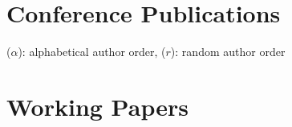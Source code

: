 \documentclass{article}
\begin{document}
    \section{Conference Publications}
    {\footnotesize($\alpha$): alphabetical author order, ($r$): random author order}
    
    \begin{etaremune}
    	[itemsep=0.2ex,
    	leftmargin=4.8ex]
    	\renewcommand{\labelenumi}{C\theenumi.}
        
    \end{etaremune}

    
    
%        
%    
%   
    
    
    
    
    
    \section{Working Papers}
    \begin{etaremune}
    	[itemsep=0.2ex,
    	leftmargin=4.8ex]
    	\renewcommand{\labelenumi}{W\theenumi.}
        
    \end{etaremune}
\end{document}

